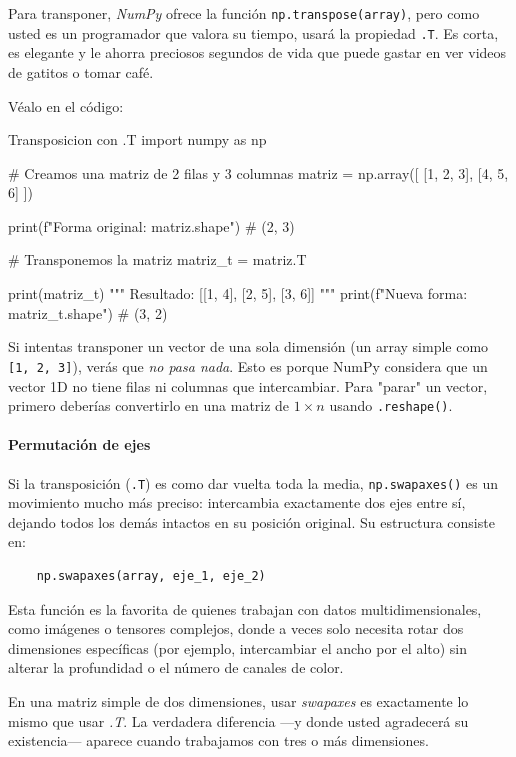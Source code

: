 Para transponer, \textit{NumPy} ofrece la función \texttt{np.transpose(array)}, pero como usted es un programador que valora su tiempo, usará la propiedad \texttt{.T}. Es corta, es elegante y le ahorra preciosos segundos de vida que puede gastar en ver videos de gatitos o tomar café.

Véalo en el código:
\begin{pycode}{Transposicion con .T}
import numpy as np

# Creamos una matriz de 2 filas y 3 columnas
matriz = np.array([
[1, 2, 3],
[4, 5, 6]
])

print(f"Forma original: {matriz.shape}") # (2, 3)

# Transponemos la matriz
matriz_t = matriz.T

print(matriz_t)
"""
Resultado:
[[1, 4],
[2, 5],
[3, 6]]
"""
print(f"Nueva forma: {matriz_t.shape}") # (3, 2)
\end{pycode}

\begin{nota}
    Si intentas transponer un vector de una sola dimensión (un array simple como \texttt{[1, 2, 3]}), verás que \textit{no pasa nada}. Esto es porque NumPy considera que un vector 1D no tiene filas ni columnas que intercambiar. Para "parar" un vector, primero deberías convertirlo en una matriz de \(1 \times n\) usando \texttt{.reshape()}.
\end{nota}



\paragraph{Permutación de ejes}

Si la transposición (\texttt{.T}) es como dar vuelta toda la media, \texttt{np.swapaxes()} es un movimiento mucho más preciso: intercambia exactamente dos ejes entre sí, dejando todos los demás intactos en su posición original. Su estructura consiste en:
\begin{verbatim}
    np.swapaxes(array, eje_1, eje_2)
\end{verbatim}


Esta función es la favorita de quienes trabajan con datos multidimensionales, como imágenes o tensores complejos, donde a veces solo necesita rotar dos dimensiones específicas (por ejemplo, intercambiar el ancho por el alto) sin alterar la profundidad o el número de canales de color.

En una matriz simple de dos dimensiones, usar \textit{swapaxes} es exactamente lo mismo que usar \textit{.T}. La verdadera diferencia —y donde usted agradecerá su existencia— aparece cuando trabajamos con tres o más dimensiones.

